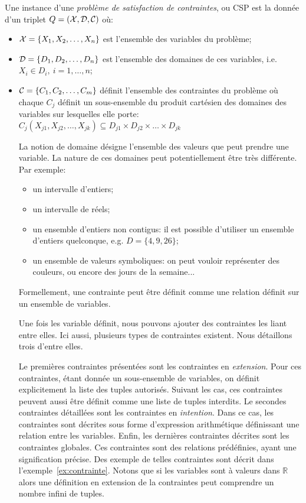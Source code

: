 Une instance d'une {\it problème de satisfaction de contraintes}, ou CSP est
la donnée d'un triplet $Q=({\cal X},{\cal D},{\cal C})$ où: 
\begin{itemize}
\item ${\cal X}=\{X_1,X_2,\dots,X_n\}$ est l'ensemble des variables du problème;
\item ${\cal D}=\{D_1,D_2,\dots,D_n\}$ est l'ensemble des domaines de ces
  variables, i.e. $X_i \in D_i,\ i=1,\dots,n$;
\item ${\cal C}=\{C_1,C_2,\dots,C_m\}$ définit l'ensemble des contraintes du
  problème où chaque $C_j$ définit un sous-ensemble du produit
  cartésien des domaines des variables sur lesquelles elle porte:
  $C_j(X_{j1},X_{j2},\dots,X_{jk}) \subseteq D_{j1} \times D_{j2}
  \times \dots \times D_{jk}$

La notion de domaine désigne l'ensemble des valeurs que peut prendre
une variable. La nature de ces domaines peut potentiellement être très
différente. Par exemple:
\begin{itemize}
\item un intervalle d'entiers;
\item un intervalle de réels;
\item un ensemble d'entiers non contigus: il est possible d'utiliser
  un ensemble d'entiers quelconque, e.g. $D=\{4,9,26\}$;
\item un ensemble de valeurs symboliques: on peut vouloir représenter
  des couleurs, ou encore des jours de la semaine... 
\end{itemize}
Formellement, une contrainte peut être définit comme une relation
définit sur un ensemble de variables. 

Une fois les variable définit, nous pouvons ajouter des contraintes
les liant entre elles. Ici aussi, plusieurs types de contraintes
existent. Nous détaillons trois d'entre elles. 

Le premières contraintes présentées sont les contraintes en {\it
  extension}. Pour ces contraintes, étant donnée un sous-ensemble de
variables, on définit explicitement la liste des tuples
autorisés. Suivant les cas, ces contraintes peuvent aussi être définit
comme une liste de tuples interdits. Le secondes contraintes
détaillées sont les contraintes en {\it intention}. Dans ce cas, les
contraintes sont décrites sous forme d'expression arithmétique
définissant  une relation entre les variables. Enfin, les dernières
contraintes décrites sont les contraintes globales. Ces contraintes
sont des relations prédéfinies, ayant une signification précise. Des
exemple de telles contraintes sont décrit dans
l'exemple~\ref{ex:contrainte}. Notons que si les variables sont à
valeurs dans $\mathbb{R}$ alors une définition en extension de la
contraintes peut comprendre un nombre infini de tuples.


\end{itemize}
